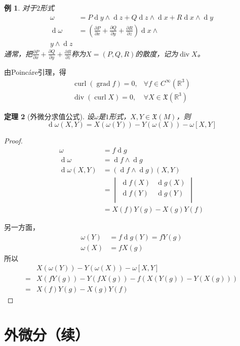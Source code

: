 \documentclass[winfonts,UTF8,c5size,a4paper,fancyhdr,hyperref,titlepage,nocap]{ctexart}
\newtheorem{thm}{定理}
\newtheorem{exa}[thm]{例}
\theoremstyle{definition}
\theoremstyle{remark}
\numberwithin{equation}{subsection}
\newcommand{\Real}{\mathbb{R}}
\newcommand{\red}{\color{red}}
\newcommand{\dd}{\operatorname{d}}
\newcommand{\pfrac}[2]{\frac{\partial{#1}}{\partial{#2}}}
\newcommand{\Xf}[1]{\mathfrak{X}(#1)}
\newcommand{\grad}{\operatorname{grad}}%
\newcommand{\curl}{\operatorname{curl}}%
\newcommand{\Div}{\operatorname{div}}%
\begin{document}
\begin{exa}
  对于$2$形式
\begin{align*}
\omega&=P\dd y\wedge\dd z+Q\dd z\wedge\dd x+R\dd x\wedge\dd y\\
\dd\omega&=(\pfrac{P}{x}+\pfrac{Q}{y}+\pfrac{R}{z})\dd x\wedge\\ y\wedge\dd z
\end{align*}
通常，把$\pfrac{P}{x}+\pfrac{Q}{y}+\pfrac{R}{z}$称为$X=(P,Q,R)$的{\red 散度}，记为$\Div X$。
\end{exa}
由Poinc\'{a}re引理，得
\begin{align*}
\curl(\grad f)=0,& \forall f\in C^{\infty}(\Real^3)\\
\Div(\curl X)=0,& \forall X\in \Xf{\Real^3}
\end{align*}
\begin{thm}[外微分求值公式]
设$\omega$是$1$形式，$X,Y\in\Xf{M}$，则
\begin{equation*}
\dd\omega(X,Y)=X(\omega(Y))-Y(\omega(X))-\omega[X,Y]
\end{equation*}
\end{thm}
\begin{proof}
  \begin{align*}
\omega&=f\dd g\\
\dd\omega&=\dd f\wedge\dd g\\
\dd\omega(X,Y)&=(\dd f\wedge\dd g)(X,Y)\\
              &=
                \begin{vmatrix}
                 \dd f(X) & \dd g(X) \\
                 \dd f(Y) & \dd g(Y) \\
                \end{vmatrix}\\
              &=X(f)Y(g)-X(g)Y(f)
   \end{align*}

   另一方面，
\begin{align*}
\omega(Y)&=f\dd g(Y)=fY(g)\\
\omega(X)&=fX(g)
\end{align*}
   所以
   \begin{align*}
   &X(\omega(Y))-Y(\omega(X))-\omega[X,Y]\\
  =&X(fY(g))-Y(fX(g))-f(X(Y(g))-Y(X(g)))\\
  =&X(f)Y(g)-X(g)Y(f)
   \end{align*}
\end{proof}

\section{外微分（续）}
\end{document}
